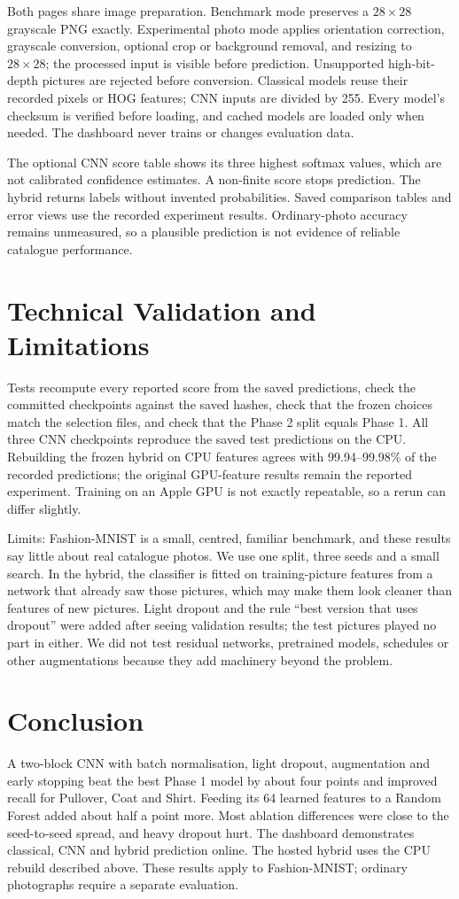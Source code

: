 \documentclass[conference]{IEEEtran}
\begin{document}
Both pages share image preparation. Benchmark mode preserves a $28\times28$ grayscale PNG exactly. Experimental photo mode applies orientation correction, grayscale conversion, optional crop or background removal, and resizing to $28\times28$; the processed input is visible before prediction. Unsupported high-bit-depth pictures are rejected before conversion. Classical models reuse their recorded pixels or HOG features; CNN inputs are divided by 255. Every model's checksum is verified before loading, and cached models are loaded only when needed. The dashboard never trains or changes evaluation data.

The optional CNN score table shows its three highest softmax values, which are not calibrated confidence estimates. A non-finite score stops prediction. The hybrid returns labels without invented probabilities. Saved comparison tables and error views use the recorded experiment results. Ordinary-photo accuracy remains unmeasured, so a plausible prediction is not evidence of reliable catalogue performance.

\section{Technical Validation and Limitations}
Tests recompute every reported score from the saved predictions, check the committed checkpoints against the saved hashes, check that the frozen choices match the selection files, and check that the Phase 2 split equals Phase 1. All three CNN checkpoints reproduce the saved test predictions on the CPU. Rebuilding the frozen hybrid on CPU features agrees with 99.94--99.98\% of the recorded predictions; the original GPU-feature results remain the reported experiment. Training on an Apple GPU is not exactly repeatable, so a rerun can differ slightly.

Limits: Fashion-MNIST is a small, centred, familiar benchmark, and these results say little about real catalogue photos. We use one split, three seeds and a small search. In the hybrid, the classifier is fitted on training-picture features from a network that already saw those pictures, which may make them look cleaner than features of new pictures. Light dropout and the rule ``best version that uses dropout'' were added after seeing validation results; the test pictures played no part in either. We did not test residual networks, pretrained models, schedules or other augmentations because they add machinery beyond the problem.

\section{Conclusion}
A two-block CNN with batch normalisation, light dropout, augmentation and early stopping beat the best Phase 1 model by about four points and improved recall for Pullover, Coat and Shirt. Feeding its 64 learned features to a Random Forest added about half a point more. Most ablation differences were close to the seed-to-seed spread, and heavy dropout hurt. The dashboard demonstrates classical, CNN and hybrid prediction online. The hosted hybrid uses the CPU rebuild described above. These results apply to Fashion-MNIST; ordinary photographs require a separate evaluation.
\end{document}
